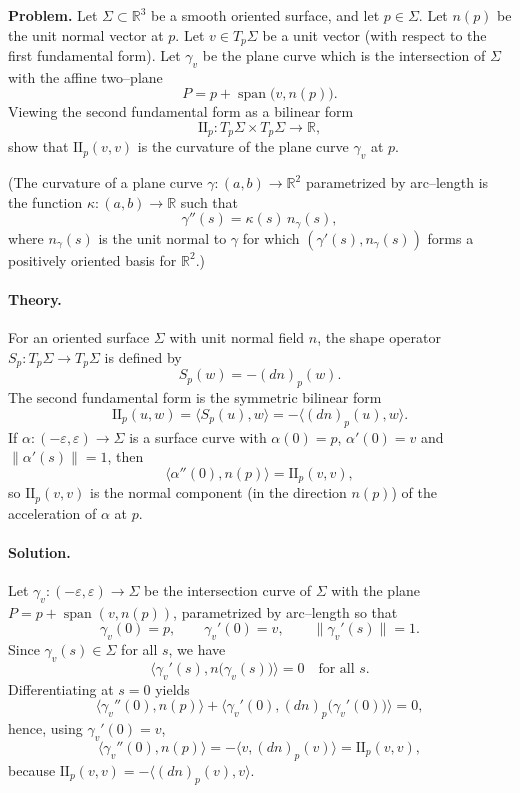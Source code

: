 \documentclass[12pt,a4paper]{article}
\theoremstyle{plain}
\DeclareMathOperator{\Span}{span}
\theoremstyle{definition}      %
\begin{document}
	\textbf{Problem.}
	Let $\Sigma\subset\mathbb{R}^3$ be a smooth oriented surface, and let $p\in\Sigma$.
	Let $n(p)$ be the unit normal vector at $p$.  Let $v\in T_p\Sigma$ be a unit
	vector (with respect to the first fundamental form).  Let $\gamma_v$ be the
	plane curve which is the intersection of $\Sigma$ with the affine two--plane
	\[
	P = p + \Span\bigl(v,n(p)\bigr).
	\]
	Viewing the second fundamental form as a bilinear form
	\[
	\mathrm{II}_p : T_p\Sigma\times T_p\Sigma\to\mathbb{R},
	\]
	show that $\mathrm{II}_p(v,v)$ is the curvature of the plane curve $\gamma_v$
	at $p$.
	
	(The curvature of a plane curve
	$\gamma:(a,b)\to\mathbb{R}^2$ parametrized by arc--length is the function
	$\kappa:(a,b)\to\mathbb{R}$ such that
	\[
	\gamma''(s)=\kappa(s)\,n_\gamma(s),
	\]
	where $n_\gamma(s)$ is the unit normal to $\gamma$ for which
	$(\gamma'(s),n_\gamma(s))$ forms a positively oriented basis for $\mathbb{R}^2$.)
	
	\paragraph{Theory.}
	For an oriented surface $\Sigma$ with unit normal field $n$, the shape operator
	$S_p:T_p\Sigma\to T_p\Sigma$ is defined by
	\[
	S_p(w) = - (dn)_p(w).
	\]
	The second fundamental form is the symmetric bilinear form
	\[
	\mathrm{II}_p(u,w) = \langle S_p(u),w\rangle
	= -\langle (dn)_p(u),w\rangle.
	\]
	If $\alpha:(-\varepsilon,\varepsilon)\to\Sigma$ is a surface curve with
	$\alpha(0)=p$, $\alpha'(0)=v$ and $\|\alpha'(s)\|=1$, then
	\[
	\langle \alpha''(0),n(p)\rangle = \mathrm{II}_p(v,v),
	\]
	so $\mathrm{II}_p(v,v)$ is the normal component (in the direction $n(p)$) of
	the acceleration of $\alpha$ at $p$.
	
	\paragraph{Solution.}
	Let $\gamma_v:(-\varepsilon,\varepsilon)\to\Sigma$ be the intersection curve of
	$\Sigma$ with the plane $P = p+\Span(v,n(p))$, parametrized by arc--length
	so that
	\[
	\gamma_v(0)=p,\qquad \gamma_v'(0)=v,\qquad \|\gamma_v'(s)\|=1.
	\]
	Since $\gamma_v(s)\in\Sigma$ for all $s$, we have
	\[
	\big\langle \gamma_v'(s), n\bigl(\gamma_v(s)\bigr)\big\rangle = 0
	\quad\text{for all } s.
	\]
	Differentiating at $s=0$ yields
	\[
	\big\langle \gamma_v''(0), n(p)\big\rangle
	+ \big\langle \gamma_v'(0), (dn)_p\bigl(\gamma_v'(0)\bigr)\big\rangle = 0,
	\]
	hence, using $\gamma_v'(0)=v$,
	\[
	\big\langle \gamma_v''(0), n(p)\big\rangle
	= -\big\langle v,(dn)_p(v)\big\rangle
	= \mathrm{II}_p(v,v),
	\]
	because $\mathrm{II}_p(v,v) = -\langle (dn)_p(v),v\rangle$.
	
\end{document}
